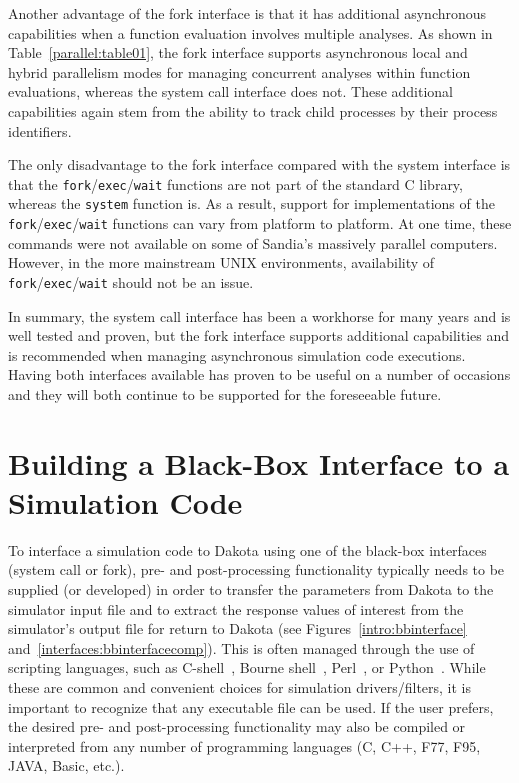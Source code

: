Another advantage of the fork interface is that it has additional
asynchronous capabilities when a function evaluation involves multiple
analyses. As shown in Table~\ref{parallel:table01}, the fork interface
supports asynchronous local and hybrid parallelism modes for managing
concurrent analyses within function evaluations, whereas the system
call interface does not. These additional capabilities again stem from
the ability to track child processes by their process
identifiers.

The only disadvantage to the fork interface compared with
the system interface is that the
\texttt{fork}/\texttt{exec}/\texttt{wait} functions are not part of
the standard C library, whereas the \texttt{system} function is. As a
result, support for implementations of the
\texttt{fork}/\texttt{exec}/\texttt{wait} functions can vary from
platform to platform. At one time, these commands were not available
on some of Sandia's massively parallel computers. However, in the more
mainstream UNIX environments, availability of
\texttt{fork}/\texttt{exec}/\texttt{wait} should not be an issue.

In summary, the system call interface has been a workhorse for many
years and is well tested and proven, but the fork interface
supports additional capabilities and is recommended when managing
asynchronous simulation code executions. Having both interfaces
available has proven to be useful on a number of occasions and they
will both continue to be supported for the foreseeable future.


\section{Building a Black-Box Interface to a Simulation Code}\label{interfaces:building}

To interface a simulation code to Dakota using one of the black-box
interfaces (system call or fork), pre- and post-processing
functionality typically needs to be supplied (or developed) in order
to transfer the parameters from Dakota to the simulator input file and
to extract the response values of interest from the simulator's output
file for return to Dakota (see Figures~\ref{intro:bbinterface}
and~\ref{interfaces:bbinterfacecomp}). This is often managed through
the use of scripting languages, such as C-shell~\cite{And86}, Bourne
shell~\cite{Bli96}, Perl~\cite{Wal96}, or Python~\cite{Mar03}. While
these are common and convenient choices for simulation
drivers/filters, it is important to recognize that any executable file
can be used. If the user prefers, the desired pre- and post-processing
functionality may also be compiled or interpreted from any number of
programming languages (C, C++, F77, F95, JAVA, Basic, etc.).

